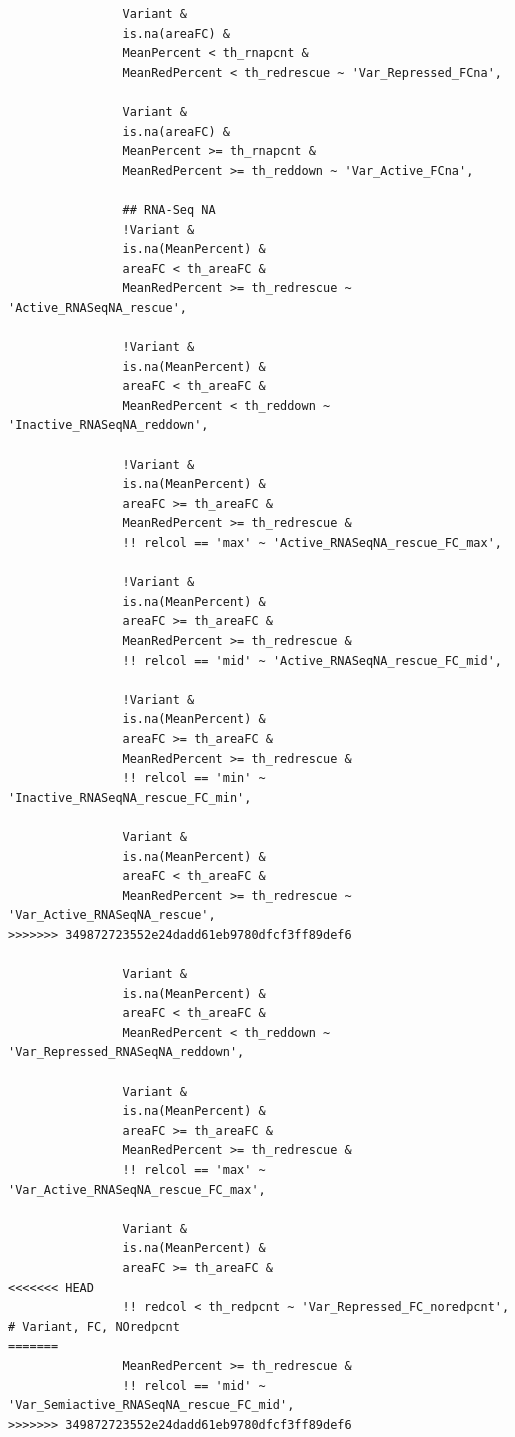 \documentclass[11pt]{article}
\begin{document}
\begin{verbatim}
                Variant &
                is.na(areaFC) &
                MeanPercent < th_rnapcnt &
                MeanRedPercent < th_redrescue ~ 'Var_Repressed_FCna',

                Variant &
                is.na(areaFC) &
                MeanPercent >= th_rnapcnt &
                MeanRedPercent >= th_reddown ~ 'Var_Active_FCna',

                ## RNA-Seq NA
                !Variant &
                is.na(MeanPercent) &
                areaFC < th_areaFC &
                MeanRedPercent >= th_redrescue ~ 'Active_RNASeqNA_rescue',

                !Variant &
                is.na(MeanPercent) &
                areaFC < th_areaFC &
                MeanRedPercent < th_reddown ~ 'Inactive_RNASeqNA_reddown',

                !Variant &
                is.na(MeanPercent) &
                areaFC >= th_areaFC &
                MeanRedPercent >= th_redrescue &
                !! relcol == 'max' ~ 'Active_RNASeqNA_rescue_FC_max',

                !Variant &
                is.na(MeanPercent) &
                areaFC >= th_areaFC &
                MeanRedPercent >= th_redrescue &
                !! relcol == 'mid' ~ 'Active_RNASeqNA_rescue_FC_mid',

                !Variant &
                is.na(MeanPercent) &
                areaFC >= th_areaFC &
                MeanRedPercent >= th_redrescue &
                !! relcol == 'min' ~ 'Inactive_RNASeqNA_rescue_FC_min',

                Variant &
                is.na(MeanPercent) &
                areaFC < th_areaFC &
                MeanRedPercent >= th_redrescue ~ 'Var_Active_RNASeqNA_rescue',
>>>>>>> 349872723552e24dadd61eb9780dfcf3ff89def6

                Variant &
                is.na(MeanPercent) &
                areaFC < th_areaFC &
                MeanRedPercent < th_reddown ~ 'Var_Repressed_RNASeqNA_reddown',

                Variant &
                is.na(MeanPercent) &
                areaFC >= th_areaFC &
                MeanRedPercent >= th_redrescue &
                !! relcol == 'max' ~ 'Var_Active_RNASeqNA_rescue_FC_max',

                Variant &
                is.na(MeanPercent) &
                areaFC >= th_areaFC &
<<<<<<< HEAD
                !! redcol < th_redpcnt ~ 'Var_Repressed_FC_noredpcnt', # Variant, FC, NOredpcnt
=======
                MeanRedPercent >= th_redrescue &
                !! relcol == 'mid' ~ 'Var_Semiactive_RNASeqNA_rescue_FC_mid',
>>>>>>> 349872723552e24dadd61eb9780dfcf3ff89def6


\end{verbatim}
\end{document}
